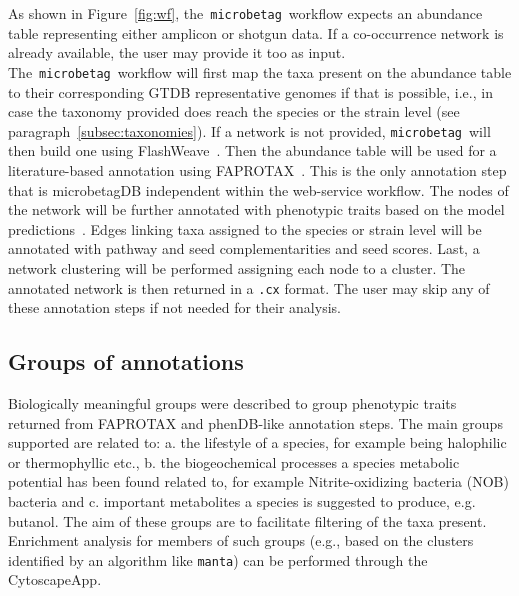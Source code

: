 \documentclass[sn-mathphys,Numbered]{sn-jnl}  %
\theoremstyle{thmstyleone}%
\theoremstyle{thmstyletwo}%
\theoremstyle{thmstylethree}%
\newcommand{\microbetag}{\texttt{microbetag}}
\begin{document}
        As shown in Figure~\ref{fig:wf}, the~\microbetag~\space workflow expects an abundance table representing either amplicon or shotgun data.
        If a co-occurrence network is already available, the user may provide it too as input.
        The~\microbetag~\space workflow will first map the taxa present on the abundance table to their corresponding GTDB representative genomes if that is possible, i.e., in case the taxonomy provided does reach the species or the strain level (see paragraph~\ref{subsec:taxonomies}).
        If a network is not provided, \microbetag~\space will then build one using FlashWeave~\cite{flashweave_cite}. 
        Then the abundance table will be used for a literature-based annotation using FAPROTAX~\cite{louca2016decoupling}.
        This is the only annotation step that is microbetagDB independent within the web-service workflow.
        The nodes of the network will be further annotated with phenotypic traits based on the model predictions~\cite{feldbauer2015prediction}.
        Edges linking taxa assigned to the species or strain level will be annotated with pathway and seed complementarities and seed scores.
        Last, a network clustering will be performed assigning each node to a cluster.
        The annotated network is then returned in a \texttt{.cx} format. 
        The user may skip any of these annotation steps if not needed for their analysis.




    \subsection*{Groups of annotations}
    \label{subsec:groups}

        Biologically meaningful groups were described to group phenotypic traits returned from FAPROTAX and phenDB-like annotation steps.
        The main groups supported are related to: 
        a. the lifestyle of a species, for example being halophilic or thermophyllic etc.,
        b. the biogeochemical processes a species metabolic potential has been found related to, for example Nitrite-oxidizing bacteria (NOB) bacteria and 
        c. important metabolites a species is suggested to produce, e.g. butanol.
        The aim of these groups are to facilitate filtering of the taxa present.
        Enrichment analysis for members of such groups 
        (e.g., based on the clusters identified by an algorithm like \texttt{manta}) 
        can be performed through the CytoscapeApp.
\end{document}
